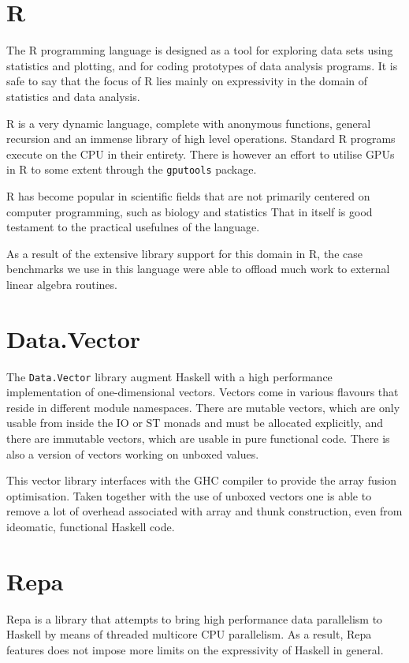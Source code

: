 \section{R}

The R programming language is designed as a tool for exploring data sets using
statistics and plotting, and for coding prototypes of data analysis programs.
It is safe to say that the focus of R lies mainly on expressivity in the domain
of statistics and data analysis.

R is a very dynamic language, complete with anonymous functions, general
recursion and an immense library of high level operations. Standard R programs
execute on the CPU in their entirety. There is however an effort to utilise
GPUs in R to some extent through the \lstinline{gputools}
package\cite{crangputools}.

R has become popular in scientific fields that are not primarily centered on
computer programming, such as biology and statistics
That in itself is good testament to the practical usefulnes of the language.

As a result of the extensive library support for this domain in R, the case
benchmarks we use in this language were able to offload much work to external
linear algebra routines.

\section{Data.Vector}

The \lstinline{Data.Vector} library augment Haskell with a high performance
implementation of one-dimensional vectors. Vectors come in various flavours
that reside in different module namespaces. There are mutable vectors, which
are only usable from inside the IO or ST monads and must be allocated
explicitly, and there are immutable vectors, which are usable in pure
functional code. There is also a version of vectors working on unboxed values.

This vector library interfaces with the GHC compiler to provide the array
fusion optimisation. Taken together with the use of unboxed vectors one is able
to remove a lot of overhead associated with array and thunk construction, even
from ideomatic, functional Haskell code.

\section{Repa}

Repa is a library that attempts to bring high performance data parallelism to
Haskell by means of threaded multicore CPU parallelism. As a result, Repa
features does not impose more limits on the expressivity of Haskell in general.

